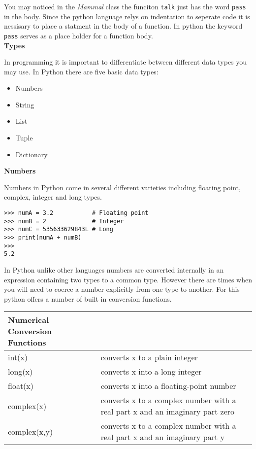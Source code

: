 \documentclass[letterpaper,11pt]{article}
\begin{document}
\par{You may noticed in the \textit{Mammal} class the funciton \texttt{talk}
    just has the word \texttt{pass} in the body. Since the python language relys
    on indentation to seperate code it is nessisary to place a statment in the
    body of a function. In python the keyword \texttt{pass} serves as a place
    holder for a function body.}
\\
\textbf{Types}
\par{In programming it is important to differentiate between different data
types you may use. In Python there are five basic data types: }
\begin{itemize}
    \setlength\itemsep{1pt}
    \item Numbers
    \item String
    \item List
    \item Tuple
    \item Dictionary
\end{itemize}
\textbf{Numbers}
\par{Numbers in Python come in several different varieties
including floating point, complex, integer and long types.}
\\
\begin{minipage}{.5\textwidth}
    \begin{tcolorbox}
        \begin{footnotesize}
            \begin{verbatim}
>>> numA = 3.2           # Floating point
>>> numB = 2             # Integer
>>> numC = 535633629843L # Long
>>> print(numA + numB)
>>>
5.2
            \end{verbatim}
        \end{footnotesize}
    \end{tcolorbox}
\end{minipage}
\par{In Python unlike other languages numbers are converted internally in an
expression containing two types to a common type. However there are times when
you will need to coerce a number explicitly from one type to another. For this
python offers a number of built in conversion functions.}
\\
\begin{tabular}[t]{l l}
    \textbf{Numerical Conversion Functions} &                                                   \\
    \hline
    int(x)       & converts x to a plain integer                                                \\
    long(x)      & converts x into a long integer                                               \\
    float(x)     & converts x into a floating-point number                                      \\
    complex(x)   & converts x to a complex number with a real part x and an imaginary part zero \\
    complex(x,y) & converts x to a complex number with a real part x and an imaginary part y    \\
\end{tabular}
\end{document}

